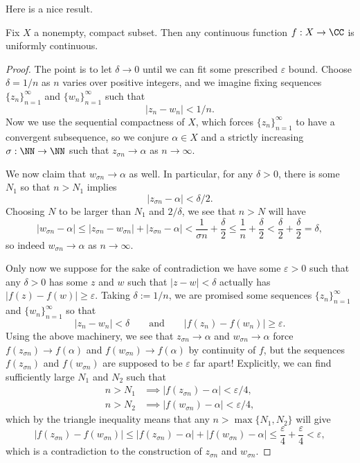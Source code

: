 Here is a nice result.
\begin{proposition}
	Fix $X$ a nonempty, compact subset. Then any continuous function $f:X\to\CC$ is uniformly continuous.
\end{proposition}
\begin{proof}
	The point is to let $\delta\to0$ until we can fit some prescribed $\varepsilon$ bound. Choose $\delta=1/n$ as $n$ varies over positive integers, and we imagine fixing sequences $\{z_n\}_{n=1}^\infty$ and $\{w_n\}_{n=1}^\infty$ such that
	\[|z_n-w_n|<1/n.\]
	Now we use the sequential compactness of $X$, which forces $\{z_n\}_{n=1}^\infty$ to have a convergent subsequence, so we conjure $\alpha\in X$ and a strictly increasing $\sigma:\NN\to\NN$ such that $z_{\sigma n}\to\alpha$ as $n\to\infty$.

	We now claim that $w_{\sigma n}\to\alpha$ as well. In particular, for any $\delta>0$, there is some $N_1$ so that $n>N_1$ implies
	\[|z_{\sigma n}-\alpha|<\delta/2.\]
	Choosing $N$ to be larger than $N_1$ and $2/\delta$, we see that $n>N$ will have
	\[|w_{\sigma n}-\alpha|\le|z_{\sigma n}-w_{\sigma n}|+|z_{\sigma n}-\alpha|<\frac1{\sigma n}+\frac\delta2\le\frac1n+\frac\delta2<\frac\delta2+\frac\delta2=\delta,\]
	so indeed $w_{\sigma n}\to\alpha$ as $n\to\infty$.

	Only now we suppose for the sake of contradiction we have some $\varepsilon>0$ such that any $\delta>0$ has some $z$ and $w$ such that $|z-w|<\delta$ actually has $|f(z)-f(w)|\ge\varepsilon$. Taking $\delta:=1/n$, we are promised some sequences $\{z_n\}_{n=1}^\infty$ and $\{w_n\}_{n=1}^\infty$ so that
	\[|z_n-w_n|<\delta\qquad\text{and}\qquad|f(z_n)-f(w_n)|\ge\varepsilon.\]
	Using the above machinery, we see that $z_{\sigma n}\to\alpha$ and $w_{\sigma n}\to\alpha$ force $f(z_{\sigma n})\to f(\alpha)$ and $f(w_{\sigma n})\to f(\alpha)$ by continuity of $f$, but the sequences $f(z_{\sigma n})$ and $f(w_{\sigma n})$ are supposed to be $\varepsilon$ far apart! Explicitly, we can find sufficiently large $N_1$ and $N_2$ such that
	\begin{align*}
		n>N_1&\implies|f(z_{\sigma n})-\alpha|<\varepsilon/4, \\
		n>N_2&\implies|f(w_{\sigma n})-\alpha|<\varepsilon/4,
	\end{align*}
	which by the triangle inequality means that any $n>\max\{N_1,N_2\}$ will give
	\[|f(z_{\sigma n})-f(w_{\sigma n})|\le|f(z_{\sigma n})-\alpha|+|f(w_{\sigma n})-\alpha|\le\frac\varepsilon4+\frac\varepsilon4<\varepsilon,\]
	which is a contradiction to the construction of $z_{\sigma n}$ and $w_{\sigma n}$.
\end{proof}


